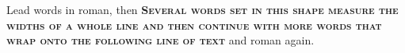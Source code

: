 \documentclass{article}
\begin{document}
Lead words in roman, then \textbf{\textsc{Several words set in this shape measure the widths of a whole line and then continue with more words that wrap onto the following line of text}} and roman again.
\end{document}

